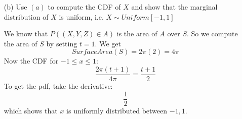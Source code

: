 \documentclass{article}
\begin{document}
\begin{itemize}
        \item [(b)] Use $(a)$ to compute the CDF of $X$ and show that the marginal distribution of $X$ is uniform, i.e. $X \sim Uniform[-1, 1]$
            \begin{answer}
                We know that $P((X, Y, Z) \in A)$ is the area of $A$ over $S$. So we compute the area of $S$ by setting $t = 1$. We get 
                    \begin{equation*}
                        SurfaceArea(S) = 2\pi(2) = 4\pi 
                    \end{equation*}
                Now the CDF for $-1 \leq x \leq 1$:
                    \begin{equation*}
                        \dfrac{2\pi(t + 1)}{4\pi} = \dfrac{t + 1}{2}
                    \end{equation*}
                To get the pdf, take the derivative:
                    \begin{equation*}
                        \dfrac{1}{2}
                    \end{equation*}
                which shows that $x$ is uniformly distributed between $-1, 1$.
            \end{answer}
    \end{itemize}
\end{document}
